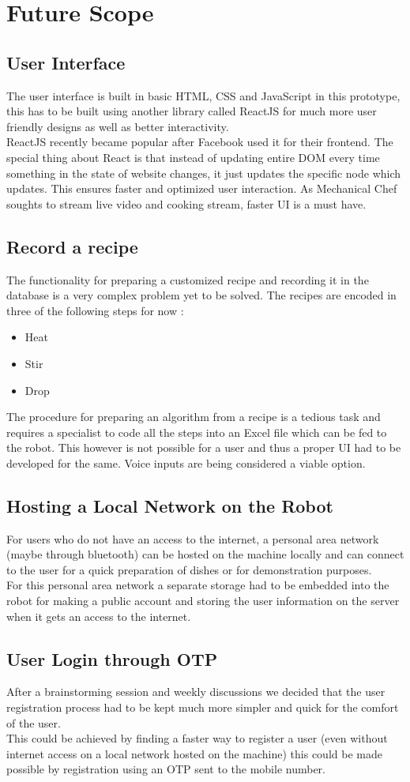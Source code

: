 \chapter{Future Scope}
\section{User Interface}
{\normalsize The user interface is built in basic HTML, CSS and JavaScript in this prototype, this has to be built using another library called ReactJS for much more user friendly designs as well as better interactivity. \\[0.1in]
ReactJS recently became popular after Facebook used it for their frontend. The special thing about React is that instead of updating entire DOM every time something in the state of website changes, it just updates the specific node which updates. This ensures faster and optimized user interaction. As Mechanical Chef soughts to stream live video and cooking stream, faster UI is a must have. 
}
\section{Record a recipe}
{\normalsize The functionality for preparing a customized recipe and recording it in the database is a very complex problem yet to be solved. The recipes are encoded in three of the following steps for now : 
\begin{itemize}
    \item Heat
    \item Stir
    \item Drop
\end{itemize}
The procedure for preparing an algorithm from a recipe is a tedious task and requires a specialist to code all the steps into an Excel file which can be fed to the robot. This however is not possible for a user and thus a proper UI had to be developed for the same. Voice inputs are being considered a viable option.
}
\section{Hosting a Local Network on the Robot}
{\normalsize For users who do not have an access to the internet, a personal area network (maybe through bluetooth) can be hosted on the machine locally and can connect to the user for a quick preparation of dishes or for demonstration purposes. \\[0.1in]
For this personal area network a separate storage had to be embedded into the robot for making a public account and storing the user information on the server when it gets an access to the internet.
}
\section{User Login through OTP}
{\normalsize After a brainstorming session and weekly discussions we decided that the user registration process had to be kept much more simpler and quick for the comfort of the user.\\[0.1in]
This could be achieved by finding a faster way to register a user (even without internet access on a local network hosted on the machine) this could be made possible by registration using an OTP sent to the mobile number.
}
